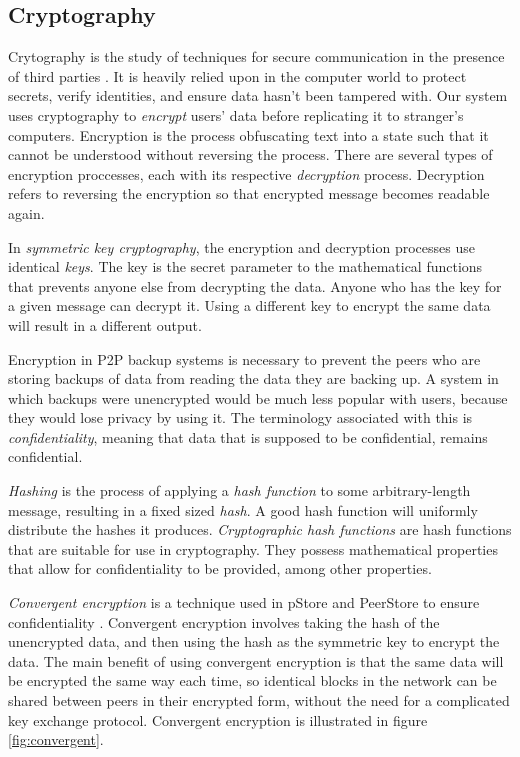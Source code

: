 \documentclass[12pt]{report}
\begin{document}
\subsection{Cryptography} \label{sec:crypto}
Crytography is the study of techniques for secure communication in the presence of third parties \cite{cryptoDef}. It is heavily relied upon in the computer world to protect secrets, verify identities, and ensure data hasn't been tampered with. Our system uses cryptography to \textit{encrypt} users' data before replicating it to stranger's computers. Encryption is the process obfuscating text into a state such that it cannot be understood without reversing the process. There are several types of encryption proccesses, each with its respective \textit{decryption} process. Decryption refers to reversing the encryption so that encrypted message becomes readable again.

In \textit{symmetric key cryptography}, the encryption and decryption processes use identical \textit{keys}. The key is the secret parameter to the mathematical functions that prevents anyone else from decrypting the data. Anyone who has the key for a given message can decrypt it. Using a different key to encrypt the same data will result in a different output.

Encryption in P2P backup systems is necessary to prevent the peers who are storing backups of data from reading the data they are backing up. A system in which backups were unencrypted would be much less popular with users, because they would lose privacy by using it. The terminology associated with this is \textit{confidentiality}, meaning that data that is supposed to be confidential, remains confidential.

\textit{Hashing} is the process of applying a \textit{hash function} to some arbitrary-length message, resulting in a fixed sized \textit{hash}. A good hash function will uniformly distribute the hashes it produces. \textit{Cryptographic hash functions} are hash functions that are suitable for use in cryptography. They possess mathematical properties that allow for confidentiality to be provided, among other properties.

\textit{Convergent encryption} is a technique used in pStore and PeerStore to ensure confidentiality \cite{pStore, PeerStore}. Convergent encryption involves taking the hash of the unencrypted data, and then using the hash as the symmetric key to encrypt the data. The main benefit of using convergent encryption is that the same data will be encrypted the same way each time, so identical blocks in the network can be shared between peers in their encrypted form, without the need for a complicated key exchange protocol. Convergent encryption is illustrated in figure \ref{fig:convergent}.
\end{document}
